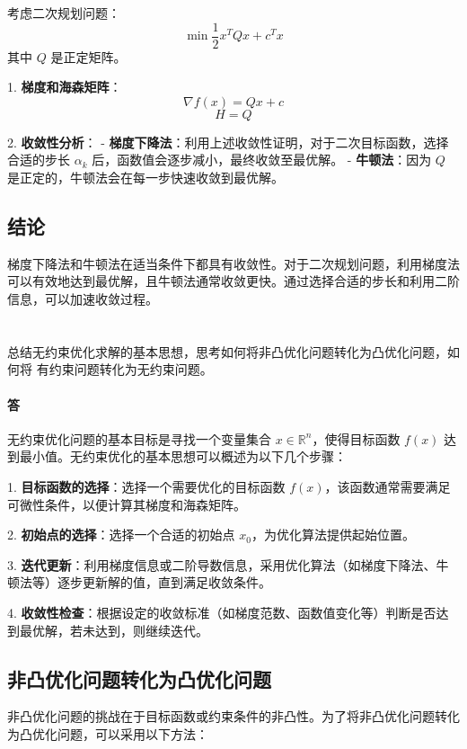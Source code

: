 \documentclass[a4paper]{article}
\begin{document}
考虑二次规划问题：
\[
\min \frac{1}{2} x^T Q x + c^T x
\]
其中 $Q$ 是正定矩阵。

1. \textbf{梯度和海森矩阵}：
   \[
   \nabla f(x) = Qx + c
   \]
   \[
   H = Q
   \]

2. \textbf{收敛性分析}：
   - \textbf{梯度下降法}：利用上述收敛性证明，对于二次目标函数，选择合适的步长 $\alpha_k$ 后，函数值会逐步减小，最终收敛至最优解。
   - \textbf{牛顿法}：因为 $Q$ 是正定的，牛顿法会在每一步快速收敛到最优解。

\subsection{结论}

梯度下降法和牛顿法在适当条件下都具有收敛性。对于二次规划问题，利用梯度法可以有效地达到最优解，且牛顿法通常收敛更快。通过选择合适的步长和利用二阶信息，可以加速收敛过程。

\section{}
总结无约束优化求解的基本思想，思考如何将非凸优化问题转化为凸优化问题，如何将
有约束问题转化为无约束问题。

\paragraph{答}

无约束优化问题的基本目标是寻找一个变量集合 $x \in \mathbb{R}^n$，使得目标函数 $f(x)$ 达到最小值。无约束优化的基本思想可以概述为以下几个步骤：

1. \textbf{目标函数的选择}：选择一个需要优化的目标函数 $f(x)$，该函数通常需要满足可微性条件，以便计算其梯度和海森矩阵。

2. \textbf{初始点的选择}：选择一个合适的初始点 $x_0$，为优化算法提供起始位置。

3. \textbf{迭代更新}：利用梯度信息或二阶导数信息，采用优化算法（如梯度下降法、牛顿法等）逐步更新解的值，直到满足收敛条件。

4. \textbf{收敛性检查}：根据设定的收敛标准（如梯度范数、函数值变化等）判断是否达到最优解，若未达到，则继续迭代。

\subsection{非凸优化问题转化为凸优化问题}

非凸优化问题的挑战在于目标函数或约束条件的非凸性。为了将非凸优化问题转化为凸优化问题，可以采用以下方法：
\end{document}
